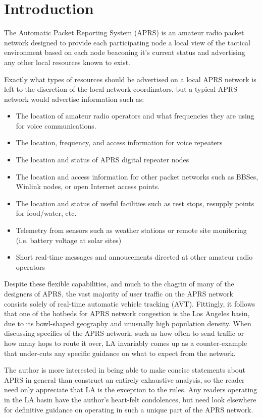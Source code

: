 

\chapter{Introduction}

The Automatic Packet Reporting System (APRS) is an amateur radio packet
network designed to provide each participating node a local view of the 
tactical environment based on each node beaconing it's current status
and advertising any other local resources known to exist.

Exactly what types of resources should be advertised on a local APRS
network is left to the discretion of the local network coordinators, but
a typical APRS network would advertise information such as:
\begin{itemize}
\item The location of amateur radio operators and what frequencies they are using for voice communications.
\item The location, frequency, and access information for voice repeaters
\item The location and status of APRS digital repeater nodes
\item The location and access information for other packet networks such as BBSes, Winlink nodes, or open Internet access points.
\item The location and status of useful facilities such as rest stops, resupply points for food/water, etc.
\item Telemetry from sensors such as weather stations or remote site monitoring (i.e. battery voltage at solar sites)
\item Short real-time messages and annoucements directed at other amateur radio operators
\end{itemize} 

Despite these flexible capabilities, 
and much to the chagrin of many of the designers of APRS, 
the vast majority of user traffic on the APRS network consists solely of 
real-time automatic vehicle tracking (AVT).
Fittingly, it follows that one of the hotbeds for APRS network congestion
is the Los Angeles basin, 
due to its bowl-shaped geography and unusually high population density.
When discussing specifics of the APRS network, such as how often to send traffic
or how many hops to route it over, LA invariably comes up as a counter-example
that under-cuts any specific guidance on what to expect from the network.

The author is more interested in being able to make concise statements about 
APRS in general than construct an entirely exhaustive analysis, 
so the reader need only appreciate that LA is the exception to the rules.
Any readers operating in the LA basin have the author's heart-felt condolences,
but need look elsewhere for definitive guidance on operating in such a unique
part of the APRS network.

